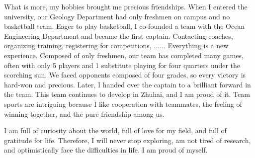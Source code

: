 \documentclass{article}
\numberwithin{equation}{section}
\begin{document}
What is more, my hobbies brought me precious friendships. When I entered the university, our Geology Department had only freshmen on campus and no basketball team. Eager to play basketball, I co-founded a team with the Ocean Engineering Department and became the first captain. Contacting coaches, organizing training, registering for competitions, ...... Everything is a new experience. Composed of only freshmen, our team has completed many games, often with only 5 players and 1 substitute playing for four quarters under the scorching sun. We faced opponents composed of four grades, so every victory is hard-won and precious. Later, I handed over the captain to a brilliant forward in the team. This team continues to develop in Zhuhai, and I am proud of it. Team sports are intriguing because I like cooperation with teammates, the feeling of winning together, and the pure friendship among us. 

I am full of curiosity about the world, full of love for my field, and full of gratitude for life. Therefore, I will never stop exploring,  am not tired of research, and optimistically face the difficulties in life. I am proud of myself.
\end{document}
